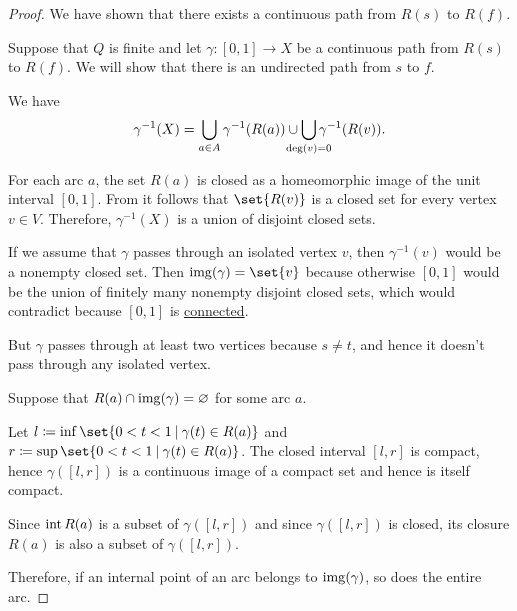 \begin{proof}
  We have shown that there exists a continuous path from \( R(s) \) to \( R(f)  \).

   Suppose that \( Q \) is finite and let \( \gamma: [0, 1] \to X \) be a continuous path from \( R(s) \) to \( R(f) \). We will show that there is an undirected path from \( s \) to \( f \).

   We have
  \begin{equation}\label{eq:thm:quiver_geometric_realization_paths/full_preimage}
    \gamma^{-1}(X) = \bigcup_{a \in A} \gamma^{-1}(R(a)) \cup \bigcup_{\mathclap{\deg(v) = 0}} \gamma^{-1}(R(v)).
  \end{equation}

  For each arc \( a \), the set \( R(a) \) is closed as a homeomorphic image of the unit interval \( [0, 1] \). From  it follows that \( \set{ R(v) } \) is a closed set for every vertex \( v \in V \). Therefore, \( \gamma^{-1}(X) \) is a union of disjoint closed sets.

  If we assume that \( \gamma \) passes through an isolated vertex \( v \), then \( \gamma^{-1}(v) \) would be a nonempty closed set. Then \( \img(\gamma) = \set{ v } \) because otherwise \( [0, 1] \) would be the union of finitely many nonempty disjoint closed sets, which would contradict  because \( [0, 1] \) is \hyperref[def:connected_space]{connected}.

  But \( \gamma \) passes through at least two vertices because \( s \neq t \), and hence it doesn't pass through any isolated vertex.

   Suppose that \( R(a) \cap \operatorname{img}(\gamma) = \varnothing \) for some arc \( a \).

  Let \( l \coloneqq \inf\set{ 0 < t < 1 \given \gamma(t) \in R(a) } \) and \( r \coloneqq \sup\set{ 0 < t < 1 \given \gamma(t) \in R(a) } \). The closed interval \( [l, r] \) is compact, hence \( \gamma([l, r]) \) is a continuous image of a compact set and hence is itself compact.

  Since \( \operatorname{int} R(a) \) is a subset of \( \gamma([l, r]) \) and since \( \gamma([l, r]) \) is closed, its closure \( R(a) \) is also a subset of \( \gamma([l, r]) \).

  Therefore, if an internal point of an arc belongs to \( \operatorname{img}(\gamma) \), so does the entire arc.


\end{proof}
